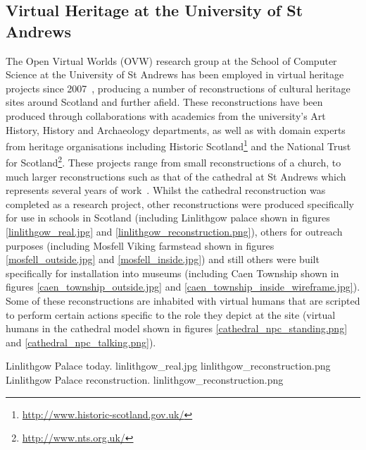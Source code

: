 

\subsection{Virtual Heritage at the University of St Andrews}

\label{virtual-heritage-at-st-andrews}


The Open Virtual Worlds (OVW) research group at the School of Computer Science at the University of St Andrews has been employed in virtual heritage projects since 2007~\cite{Getchell2007}, producing a number of reconstructions of cultural heritage sites around Scotland and further afield. These reconstructions have been produced through collaborations with academics from the university's Art History, History and Archaeology departments, as well as with domain experts from heritage organisations including Historic Scotland\footnote{\url{http://www.historic-scotland.gov.uk/}} and the National Trust for Scotland\footnote{\url{http://www.nts.org.uk/}}. These projects range from small reconstructions of a church, to much larger reconstructions such as that of the cathedral at St Andrews which represents several years of work~\cite{Kennedy2013}. Whilst the cathedral reconstruction was completed as a research project, other reconstructions were produced specifically for use in schools in Scotland (including Linlithgow palace shown in figures \ref{linlithgow_real.jpg} and \ref{linlithgow_reconstruction.png}), others for outreach purposes (including Mosfell Viking farmstead shown in figures \ref{mosfell_outside.jpg} and \ref{mosfell_inside.jpg}) and still others were built specifically for installation into museums (including Caen Township shown in figures  \ref{caen_township_outside.jpg} and \ref{caen_township_inside_wireframe.jpg}). Some of these reconstructions are inhabited with virtual humans that are scripted to perform certain actions specific to the role they depict at the site (virtual humans in the cathedral model shown in figures \ref{cathedral_npc_standing.png} and \ref{cathedral_npc_talking.png}).

 {Linlithgow Palace today.} {linlithgow_real.jpg}
       {linlithgow_reconstruction.png} {Linlithgow Palace reconstruction.} {linlithgow_reconstruction.png}

